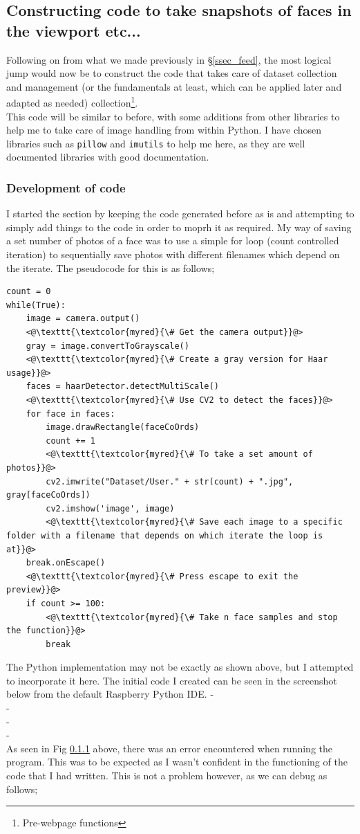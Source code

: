 \documentclass[9pt]{article}
\begin{document}
\newpage
\subsection{Constructing code to take snapshots of faces in the viewport etc...}
Following on from what we made previously in \S\ref{ssec_feed}, the most logical jump would now be to construct the code that takes care of dataset collection and management (or the fundamentals at least, which can be applied later and adapted as needed) collection\footnote{Pre-webpage functions}. \\
This code will be similar to before, with some additions from other libraries to help me to take care of image handling from within Python. I have chosen libraries such as \texttt{pillow}\cite{PIL} and \texttt{imutils}\cite{imutils} to help me here, as they are well documented libraries with good documentation.
\subsubsection{Development of code}
I started the section by keeping the code generated before as is and attempting to simply add things to the code in order to moprh it as required. My way of saving a set number of photos of a face was to use a simple for loop (count controlled iteration) to sequentially save photos with different filenames which depend on the iterate. The pseudocode for this is as follows;
\begin{lstlisting}
count = 0
while(True):
	image = camera.output()
	<@\texttt{\textcolor{myred}{\# Get the camera output}}@> 
	gray = image.convertToGrayscale()
	<@\texttt{\textcolor{myred}{\# Create a gray version for Haar usage}}@> 
	faces = haarDetector.detectMultiScale()
	<@\texttt{\textcolor{myred}{\# Use CV2 to detect the faces}}@> 
	for face in faces:
		image.drawRectangle(faceCoOrds) 
		count += 1
		<@\texttt{\textcolor{myred}{\# To take a set amount of photos}}@> 
		cv2.imwrite("Dataset/User." + str(count) + ".jpg", gray[faceCoOrds])
		cv2.imshow('image', image)
		<@\texttt{\textcolor{myred}{\# Save each image to a specific folder with a filename that depends on which iterate the loop is at}}@> 
	break.onEscape() 
	<@\texttt{\textcolor{myred}{\# Press escape to exit the preview}}@> 
	if count >= 100: 
		<@\texttt{\textcolor{myred}{\# Take n face samples and stop the function}}@> 
		break
\end{lstlisting}
The Python implementation may not be exactly as shown above, but I attempted to incorporate it here. The initial code I created can be seen in the screenshot below from the default Raspberry Python IDE.
-\\
-\\
-\\
-\\
As seen in Fig \ref{} above, there was an error encountered when running the program. This was to be expected as I wasn't confident in the functioning of the code that I had written. This is not a problem however, as we can debug as follows;
\end{document}
